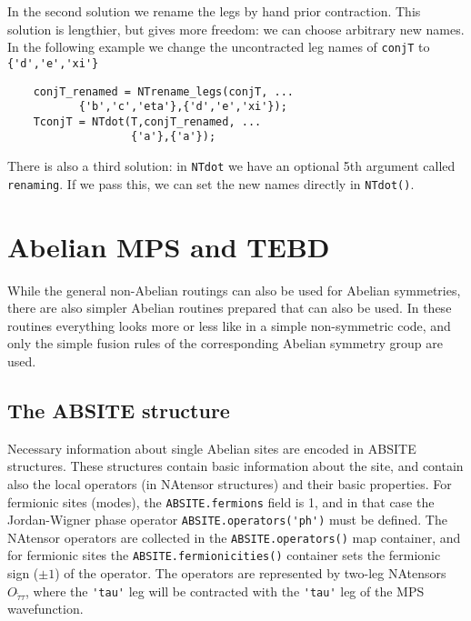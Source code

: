 \documentclass[aps,prb,twocolumn,showpacs,preprintnumbers,amsmath,amssymb, superscriptaddressm, nofootinbib]{revtex4-2}   %
\begin{document}
In the second solution we rename the legs by hand prior contraction. This solution is lengthier, but gives more freedom: we can choose arbitrary new names. In the following example we change the uncontracted leg names of \verb|conjT| to \verb|{'d','e','xi'}|
\begin{verbatim}
    conjT_renamed = NTrename_legs(conjT, ... 
           {'b','c','eta'},{'d','e','xi'});
    TconjT = NTdot(T,conjT_renamed, ... 
                   {'a'},{'a'});
\end{verbatim}

There is also a third solution: in \verb|NTdot| we have an optional 5th argument called \verb|renaming|. If we pass this, we can set the new names directly in \verb|NTdot()|.
\vspace{6pt}

\section{Abelian MPS and TEBD}
While the general non-Abelian routings can also be used for Abelian symmetries, there are also simpler Abelian routines prepared that can also be used. In these routines everything looks more or less like in a simple non-symmetric code, and only the simple fusion rules of the corresponding Abelian symmetry group are used.

\subsection{The ABSITE structure}
Necessary information about single Abelian sites are encoded in ABSITE structures. These structures contain basic information about the site, and contain also the local operators (in NAtensor structures) and their basic properties. 
For fermionic sites (modes), the \verb|ABSITE.fermions| field is 1, and in that case the Jordan-Wigner phase operator \verb|ABSITE.operators('ph')| must be defined.
The NAtensor operators are collected in the \verb|ABSITE.operators()| map container, and for fermionic sites the \verb|ABSITE.fermionicities()| container sets the fermionic sign ($\pm 1$) of the operator. The operators are represented by two-leg NAtensors $O_{\tilde{\tau} \tau}$, where the \verb|'tau'| leg will be contracted with the \verb|'tau'| leg of the MPS wavefunction.  
\end{document}

